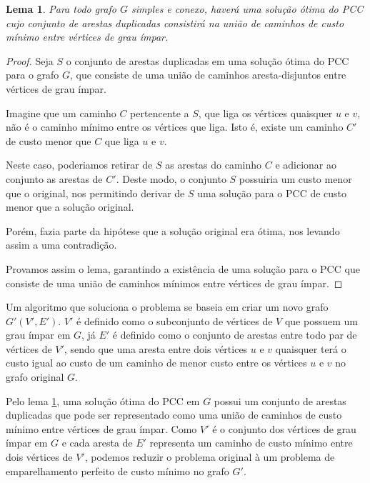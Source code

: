 \documentclass{article}
\newtheorem{lemma}{Lema}
\begin{document}
\begin{lemma}
    \label{lema-final}
    Para todo grafo $G$ simples e conexo, haverá uma solução ótima do PCC cujo conjunto de arestas duplicadas consistirá na união de caminhos de custo mínimo entre vértices de grau ímpar.
\end{lemma}

\begin{proof}
    Seja $S$ o conjunto de arestas duplicadas em uma solução ótima do PCC para o grafo $G$, que consiste de uma união de caminhos aresta-disjuntos entre vértices de grau ímpar.

    Imagine que um caminho $C$ pertencente a $S$, que liga os vértices quaisquer $u$ e $v$, não é o caminho mínimo entre os vértices que liga. 
    Isto é, existe um caminho $C'$ de custo menor que $C$ que liga $u$ e $v$.

    Neste caso, poderiamos retirar de $S$ as arestas do caminho $C$ e adicionar ao conjunto as arestas de $C'$. Deste modo, o conjunto $S$ possuiria um custo menor que o original, nos permitindo derivar de $S$ uma solução para o PCC de custo menor que a solução original.

    Porém, fazia parte da hipótese que a solução original era ótima, nos levando assim a uma contradição.

    Provamos assim o lema, garantindo a existência de uma solução para o PCC que consiste de uma união de caminhos mínimos entre vértices de grau ímpar.

\end{proof}

Um algoritmo que soluciona o problema se baseia em criar um novo grafo $G'(V', E')$. 
$V'$ é definido como o subconjunto de vértices de $V$ que possuem um grau ímpar em $G$, já $E'$ é definido como o conjunto de arestas entre todo par de vértices de $V'$, sendo que uma aresta entre dois vértices $u$ e $v$ quaisquer terá o custo igual ao custo de um caminho de menor custo entre os vértices $u$ e $v$ no grafo original $G$.


Pelo lema \ref{lema-final}, uma solução ótima do PCC em $G$ possui um conjunto de arestas duplicadas que pode ser representado como uma união de caminhos de custo mínimo entre vértices de grau ímpar. 
Como $V'$ é o conjunto dos vértices de grau ímpar em $G$ e cada aresta de $E'$ representa um caminho de custo mínimo entre dois vértices de $V'$, podemos reduzir o problema original à um problema de emparelhamento perfeito de custo mínimo no grafo $G'$.
\end{document}
